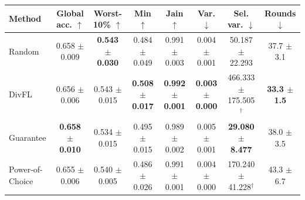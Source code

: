 \begin{tabular}{lccccccc}
\toprule
Method & Global acc. $\uparrow$ & Worst-10\% $\uparrow$ & Min $\uparrow$ & Jain $\uparrow$ & Var. $\downarrow$ & Sel. var. $\downarrow$ & Rounds $\downarrow$ \\
\midrule
Random & 0.658 $\pm$ 0.009 & \textbf{0.543 $\pm$ 0.030} & 0.484 $\pm$ 0.049 & 0.991 $\pm$ 0.003 & 0.004 $\pm$ 0.001 & 50.187 $\pm$ 22.293 & 37.7 $\pm$ 3.1 \\
DivFL & 0.656 $\pm$ 0.006 & 0.543 $\pm$ 0.015 & \textbf{0.508 $\pm$ 0.017} & \textbf{0.992 $\pm$ 0.001} & \textbf{0.003 $\pm$ 0.000} & 466.333 $\pm$ 175.505$^\dagger$ & \textbf{33.3 $\pm$ 1.5} \\
Guarantee & \textbf{0.658 $\pm$ 0.010} & 0.534 $\pm$ 0.015 & 0.495 $\pm$ 0.015 & 0.989 $\pm$ 0.002 & 0.005 $\pm$ 0.001 & \textbf{29.080 $\pm$ 8.477} & 38.0 $\pm$ 3.5 \\
Power-of-Choice & 0.655 $\pm$ 0.006 & 0.540 $\pm$ 0.005 & 0.486 $\pm$ 0.026 & 0.991 $\pm$ 0.001 & 0.004 $\pm$ 0.000 & 170.240 $\pm$ 41.228$^\dagger$ & 43.3 $\pm$ 6.7 \\
\bottomrule
\end{tabular}
